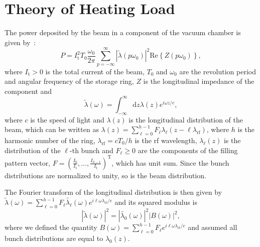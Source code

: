 \documentclass
[
    a4paper,
    nospread,     %
]{jacow}
\providecommand{\der}{\mathrm{d}}
\providecommand{\rf}{\mathrm{rf}}
\providecommand{\Real}[1]{\ensuremath{\mathrm{Re}\left\{#1\right\}}}
\begin{document}
\section{Theory of Heating Load}
    The power deposited by the beam in a component of the vacuum chamber is given by~\cite{Chao:1993zn}:
    \begin{equation}\label{eq:power_general}
        P = I_\mathrm{t}^2T_0 \frac{\omega_0}{2\pi}\sum_{p=-\infty}^{\infty} \left|\tilde{\lambda}(p\omega_0)\right|^2\Real{Z(p\omega_0)},
    \end{equation}
    where $I_\mathrm{t}>0$ is the total current of the beam, $T_0$ and $\omega_0$ are the revolution period and angular frequency of the storage ring, $Z$ is the longitudinal impedance of the component and 
    \begin{equation}
        \tilde{\lambda}(\omega) = \int_{-\infty}^\infty\der z \lambda(z) e^{i\omega z/c},
    \end{equation}
    where $c$ is the speed of light and $\lambda(z)$ is the longitudinal distribution of the beam, which can be written as
    $
        \lambda(z) = \sum_{\ell=0}^{h-1} F_\ell \lambda_\ell(z - \ell \lambda_\rf)
    $,
    where $h$ is the harmonic number of the ring, $\lambda_\rf=cT_0/h$ is the rf wavelength, $\lambda_\ell(z)$ is the distribution of the $\ell$-th bunch and $F_\ell \ge 0$ are the components of the filling pattern vector,
    $
    F = \left(\frac{I_0}{I_\mathrm{t}},\dots, \frac{I_{h-1}}{I_\mathrm{t}}\right)^\mathrm{T}
    $,
    which has unit sum. Since the bunch distributions are normalized to unity, so is the beam distribution.
    
    The Fourier transform of the longitudinal distribution is then given by
    $
        \tilde{\lambda}(\omega) = \sum_{\ell=0}^{h-1}F_\ell\tilde{\lambda_\ell}(\omega)e^{i\ell\omega \lambda_\rf/c}
    $
    and its squared modulus is
    \begin{equation}\label{eq:modulus_squared}
        \left|\tilde{\lambda}(\omega)\right|^2 = \left|\tilde{\lambda_0}(\omega)\right|^2 \left|B(\omega)\right|^2,
    \end{equation}
    where we defined the quantity $B(\omega) = \sum_{\ell=0}^{h-1}F_\ell e^{i\ell\omega \lambda_\rf/c}$
    and assumed all bunch distributions are equal to $\lambda_0(z)$.
\end{document}
